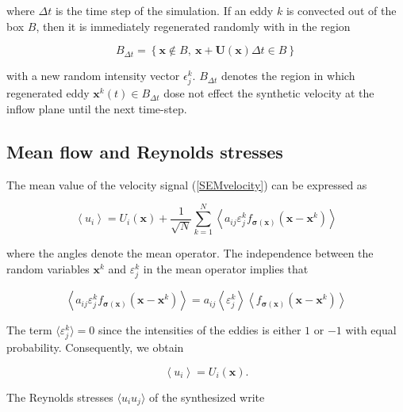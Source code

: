 \noindent where $\varDelta t$ is the time step of the simulation. If an eddy $k$ is convected out of the box $B$, then it is immediately regenerated randomly with in the region

\begin{equation}
B_{\varDelta t} = \left\{ \boldsymbol{x}\notin B, \ \boldsymbol{x}+\boldsymbol{U}(\boldsymbol{x})\varDelta t \in B \right\}
\end{equation}

\noindent with a new random intensity vector $\epsilon_j^k$. $B_{\varDelta t}$ denotes the region in which regenerated eddy $\boldsymbol{x}^k(t) \in B_{\varDelta t}$ dose not effect the synthetic velocity at the inflow plane until the next time-step.

\subsection{Mean flow and Reynolds stresses}

\noindent The mean value of the velocity signal (\ref{SEMvelocity}) can be expressed as

\begin{equation}
\left\langle u_i \right\rangle = U_i(\boldsymbol{x}) + \frac{1}{\sqrt{N}}\sum_{k=1}^N \left\langle a_{ij} \varepsilon_j^k f_{\boldsymbol{\sigma}(\boldsymbol{x})}(\boldsymbol{x}-\boldsymbol{x}^k) \right\rangle
\end{equation}

\noindent where the angles denote the mean operator. The independence between the random variables $\boldsymbol{x}^k$ and $\varepsilon_j^k$ in the mean operator implies that

\begin{equation}
\left\langle a_{ij} \varepsilon_j^k f_{\boldsymbol{\sigma}(\boldsymbol{x})}(\boldsymbol{x}-\boldsymbol{x}^k) \right\rangle = a_{ij} \left\langle\varepsilon_j^k\right\rangle  \left\langle f_{\boldsymbol{\sigma}(\boldsymbol{x})}(\boldsymbol{x}-\boldsymbol{x}^k)  \right\rangle
\end{equation}

\noindent The term $\langle\varepsilon_j^k\rangle = 0$ since the intensities of the eddies is either $1$ or $-1$ with equal probability. Consequently, we obtain

\begin{equation}
\left\langle u_i \right\rangle = U_i(\boldsymbol{x}).
\end{equation}

\noindent The Reynolds stresses $\langle u_i u_j \rangle$ of the synthesized write

